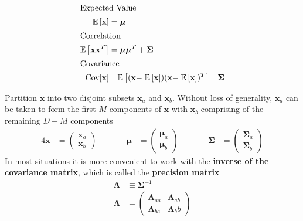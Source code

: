 \documentclass[11pt]{article}
\theoremstyle{definition}
\newcommand*\ev[1]{\mathrel{\mathbb{E}\left[#1\right]}}
\begin{document}
\begin{definition}
	\begin{align*}
		\intertext{Expected Value}
		\ev{\textbf{x}} &= \bm{\mu}\\
		\intertext{Correlation}
		\ev{\textbf{xx}^T} &= \bm{\mu\mu}^T + \bm{\Sigma}\\
		\intertext{Covariance}
		\text{Cov}[\textbf{x}] &= \ev{(\textbf{x}-\ev{\textbf{x}})(\textbf{x}-\ev{\textbf{x}})^T} = \bm{\Sigma}
	\end{align*}
\end{definition}

Partition $\textbf{x}$ into two disjoint subsets $\textbf{x}_a$ and $\textbf{x}_b$. Without loss of generality, $\textbf{x}_a$ can be taken to form the first $M$ components of $\textbf{x}$ with $\textbf{x}_b$ comprising of the remaining $D-M$ components
\begin{alignat*}{4}
	\textbf{x}&=\begin{pmatrix}\textbf{x}_a\\\textbf{x}_b\end{pmatrix} &\qquad& \bm{\mu} &= \begin{pmatrix}\bm{\mu}_a\\\bm{\mu}_b\end{pmatrix} &\qquad& \bm{\Sigma} &= \begin{pmatrix}\bm{\Sigma}_a\\\bm{\Sigma}_b\end{pmatrix}
\end{alignat*}
In most situations it is more convenient to work with the \textbf{inverse of the covariance matrix}, which is called the \textbf{precision matrix}
\begin{align*}
	\bm{\Lambda} &\equiv \bm{\Sigma}^{-1}\\
	\bm{\Lambda} &= \begin{pmatrix}
		\bm{\Lambda}_{aa} & \bm{\Lambda}_{ab}\\
		\bm{\Lambda}_{ba} & \bm{\Lambda}_bb
	\end{pmatrix}
\end{align*}


\end{document}
